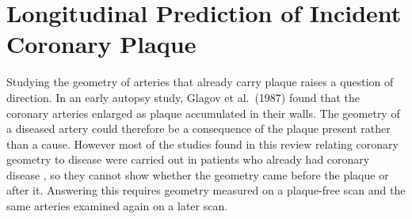 \section{Longitudinal Prediction of Incident Coronary Plaque}
\label{sec:lit-risk}

Studying the geometry of arteries that already carry plaque raises a question of direction.
In an early autopsy study, Glagov et al.\ (1987) \cite{glagov1987remodeling} found that the coronary
arteries enlarged as plaque accumulated in their walls.
The geometry of a diseased artery could therefore be a consequence of the plaque present rather than a cause.
However most of the studies found in this review relating coronary geometry to disease were carried out in patients who already
had coronary disease
\cite{li2011tortuosity,zhang2024curvature,han2022plaque,tommasino2024clap,telloayala2026tortuosity},
so they cannot show whether the geometry came before the plaque or after it.
Answering this requires geometry measured on a plaque-free scan and the same arteries examined
again on a later scan.

